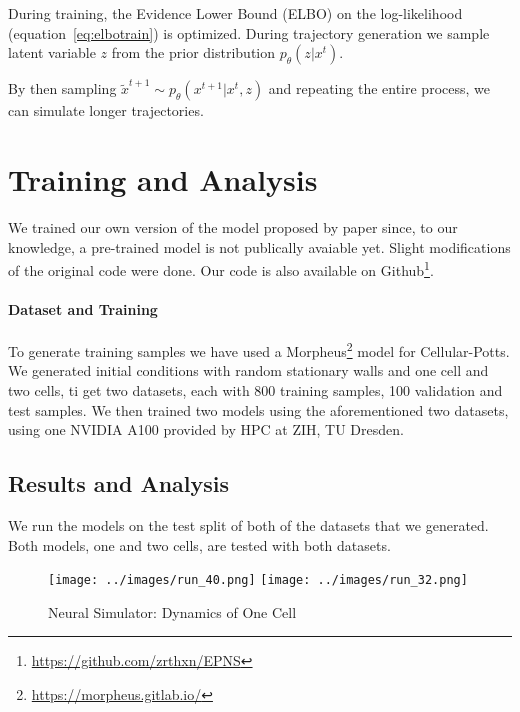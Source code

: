\documentclass[a4paper,10pt,twocolumn]{article}
\begin{document}
            During training, the Evidence Lower Bound (ELBO) on the log-likelihood (equation~\ref{eq:elbotrain})
            is optimized. During trajectory generation we sample latent variable $z$ from the prior 
            distribution $p_\theta(z | x^t)$.
            
            By then sampling $\tilde{x}^{t+1} \sim p_\theta(x^{t+1}|x^t, z)$ and
            repeating the entire process, we can simulate longer trajectories.


    \section{Training and Analysis}
        We trained our own version of the model proposed by paper since, to our knowledge, 
        a pre-trained model is not publically avaiable yet. Slight modifications of the original code were done. 
        Our code is also available on Github\footnote{\url{https://github.com/zrthxn/EPNS}}.

        \paragraph{Dataset and Training}
        To generate training samples we have used a Morpheus\footnote{\url{https://morpheus.gitlab.io/}}\cite{morpheus} 
        model for Cellular-Potts.
        We generated initial conditions with random stationary walls and one cell and two cells, 
        ti get two datasets, each with 800 training samples, 100 validation and test samples.
        We then trained two models using the aforementioned two datasets, using one NVIDIA A100 
        provided by HPC at ZIH, TU Dresden.

        \subsection{Results and Analysis}
            We run the models on the test split of both of the datasets that we generated.
            Both models, one and two cells, are tested with both datasets.

            \begin{figure}[H]\centering
                \texttt{[image: ../images/run\_40.png]}
                \texttt{[image: ../images/run\_32.png]}
                \caption{Neural Simulator: Dynamics of One Cell}
            \end{figure}
            
\end{document}
